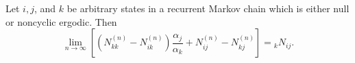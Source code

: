 Let $i, j$, and $k$ be arbitrary states in a recurrent Markov chain which is either null or noncyclic ergodic. Then
$$\lim_{n \to \infty} \left[ (N_{kk}^{(n)} - N_{ik}^{(n)}) \frac{\alpha_j}{\alpha_k} + N_{ij}^{(n)} - N_{kj}^{(n)} \right] = {}_k N_{ij}.$$
